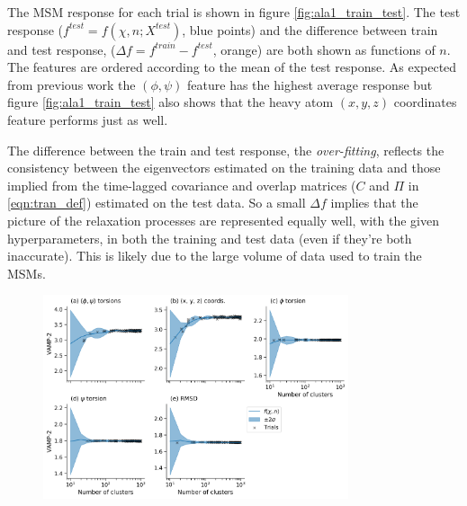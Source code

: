 The MSM response for each trial is shown in figure \ref{fig:ala1_train_test}. The test response ($f^{test} = f(\chi, n; X^{test})$, blue points) and the difference between train and test response, ($\Delta f = f^{train} - f^{test}$, orange) are both shown as functions of $n$. The features are ordered according to the  mean of the test response. As expected from previous work \cite{bolhuis2000reaction} the  $(\phi, \psi)$ feature has the highest average response but figure \ref{fig:ala1_train_test} also shows that the heavy atom $(x,y,z)$ coordinates feature performs just as well. 

The difference between the train and test response, the \emph{over-fitting}, reflects the consistency between the eigenvectors estimated on the training data and those implied from the time-lagged covariance and overlap matrices ($C$ and $\Pi$  in \ref{eqn:tran_def}) estimated  on the test data. So a small $\Delta f$ implies that the picture of the relaxation processes are represented equally well, with the given hyperparameters, in both the training and test data (even if they're both inaccurate). This is likely due to the large volume of data used to train the MSMs. 

\begin{figure}
    \centering
    \includegraphics[width=0.8\textwidth]{chapters/msm_optimization/figures/ala1_response_surface.png}
    \label{fig:ala1_response}
\end{figure}

